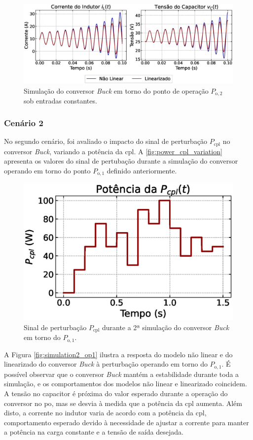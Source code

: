 \begin{figure}[H]
  \centering
  \captionsetup{justification=centering}
  \includegraphics[width=1.\textwidth]{figuras/buck/sim1/op2/result.eps}
  \caption{Simulação do conversor \textit{Buck} em torno do ponto de operação $P_{\mathrm{o}, 2}$ sob entradas constantes.}
  \label{fig:simulation_1_buck_2}
\end{figure}

\subsubsection{Cenário 2}

No segundo cenário, foi avaliado o impacto do sinal de perturbação $P_{\mathrm{cpl}}$ no conversor \textit{Buck}, variando a potência da \acrshort{cpl}. A \autoref{fig:power_cpl_variation} apresenta os valores do sinal de pertubação durante a simulação do conversor operando em torno do ponto $P_{\mathrm{o}, 1}$ definido anteriormente.

\begin{figure}[H]
  \centering
  \includegraphics[width=.5\textwidth]{figuras/buck/sim2/op1/power_cpl_variation.eps}
  \captionsetup{justification=centering}
  \caption{Sinal de perturbação $P_{\mathrm{cpl}}$ durante a 2ª simulação do conversor \textit{Buck} em torno do $P_{\mathrm{o}, 1}$.}
  \label{fig:power_cpl_variation}
\end{figure}

A Figura \ref{fig:simulation2_op1} ilustra a resposta do modelo não linear e do linearizado do conversor \textit{Buck} à perturbação operando em torno do $P_{\mathrm{o}, 1}$.  É possível observar que o conversor \textit{Buck} mantém a estabilidade durante toda a simulação, e os comportamentos dos modelos não linear e linearizado coincidem. A tensão no capacitor é próxima do valor esperado durante a operação do conversor no \acrshort{po}, mas se desvia à medida que a potência da \acrshort{cpl} aumenta. Além disto, a corrente no indutor varia de acordo com a potência da \acrshort{cpl}, comportamento esperado devido à necessidade de ajustar a corrente para manter a potência na carga constante e a tensão de saída desejada.

